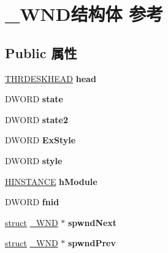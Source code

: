 \hypertarget{struct___w_n_d}{}\section{\+\_\+\+W\+N\+D结构体 参考}
\label{struct___w_n_d}
\subsection*{Public 属性}
\begin{DoxyCompactItemize}
\item 
\mbox{\label{struct___w_n_d_a3e1f3b9fa67def1ba25f811c6a9e329a}} 
\hyperlink{struct___t_h_r_d_e_s_k_h_e_a_d}{T\+H\+R\+D\+E\+S\+K\+H\+E\+AD} {\bfseries head}
\item 
\mbox{\label{struct___w_n_d_ac239f30b04f8170681e6c1d8d867dac4}} 
D\+W\+O\+RD {\bfseries state}
\item 
\mbox{\label{struct___w_n_d_a54449c197c1c9489cc369f3373788cbf}} 
D\+W\+O\+RD {\bfseries state2}
\item 
\mbox{\label{struct___w_n_d_a06e64ff220d0477f2a24fe09d279da8c}} 
D\+W\+O\+RD {\bfseries Ex\+Style}
\item 
\mbox{\label{struct___w_n_d_a521f1a429089f4098896050727ef1725}} 
D\+W\+O\+RD {\bfseries style}
\item 
\mbox{\label{struct___w_n_d_ae3a51b7b512088274b992f8eb38ef9d3}} 
\hyperlink{interfacevoid}{H\+I\+N\+S\+T\+A\+N\+CE} {\bfseries h\+Module}
\item 
\mbox{\label{struct___w_n_d_a5f6041460d5ae61e2752e4324b9e1c1a}} 
D\+W\+O\+RD {\bfseries fnid}
\item 
\mbox{\label{struct___w_n_d_ae0463c1b9f920088a3c08ea05656face}} 
\hyperlink{interfacestruct}{struct} \hyperlink{struct___w_n_d}{\+\_\+\+W\+ND} $\ast$ {\bfseries spwnd\+Next}
\item 
\mbox{\label{struct___w_n_d_a3515e9a758a2d278149c3da8b7725835}} 
\hyperlink{interfacestruct}{struct} \hyperlink{struct___w_n_d}{\+\_\+\+W\+ND} $\ast$ {\bfseries spwnd\+Prev}

\end{DoxyCompactItemize}
